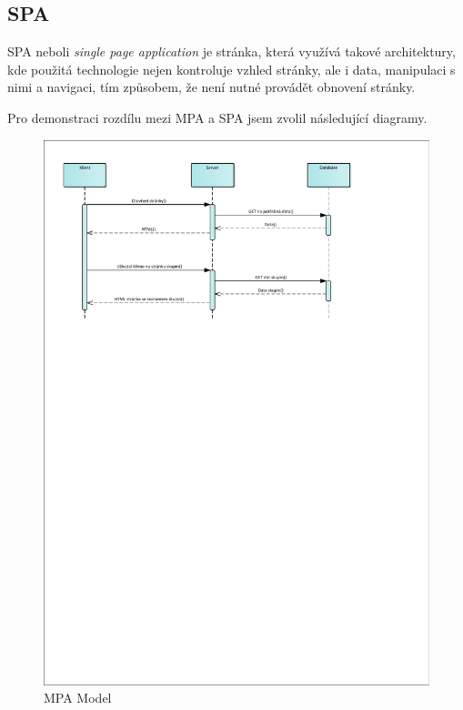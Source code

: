 \subsection{SPA}
SPA neboli \emph{single page application} je stránka, která využívá takové architektury, kde použitá technologie nejen kontroluje
vzhled stránky, ale i data, manipulaci s nimi a navigaci, tím způsobem, že není nutné provádět obnovení stránky.\cite{VueSPA}

Pro demonstraci rozdílu mezi MPA a SPA jsem zvolil následující diagramy.

\begin{figure}[H]
    \includegraphics[width=\textwidth]{pdf/MPA-model}
    \caption{MPA Model} \label{picture:recipeo:mpa-model}
\end{figure}
